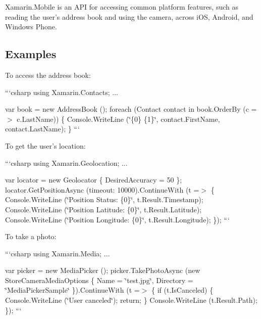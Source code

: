 Xamarin.\+Mobile is an A\+P\+I for accessing common platform features, such as reading the user's address book and using the camera, across i\+O\+S, Android, and Windows Phone.

\subsection*{Examples}

To access the address book\+:

```csharp using Xamarin.\+Contacts; ...

var book = new Address\+Book (); foreach (Contact contact in book.\+Order\+By (c =$>$ c.\+Last\+Name)) \{ Console.\+Write\+Line (\char`\"{}\{0\} \{1\}\char`\"{}, contact.\+First\+Name, contact.\+Last\+Name); \} ```

To get the user's location\+:

```csharp using Xamarin.\+Geolocation; ...

var locator = new Geolocator \{ Desired\+Accuracy = 50 \}; locator.\+Get\+Position\+Async (timeout\+: 10000).Continue\+With (t =$>$ \{ Console.\+Write\+Line (\char`\"{}\+Position Status\+: \{0\}\char`\"{}, t.\+Result.\+Timestamp); Console.\+Write\+Line (\char`\"{}\+Position Latitude\+: \{0\}\char`\"{}, t.\+Result.\+Latitude); Console.\+Write\+Line (\char`\"{}\+Position Longitude\+: \{0\}\char`\"{}, t.\+Result.\+Longitude); \}); ```

To take a photo\+:

```csharp using Xamarin.\+Media; ...

var picker = new Media\+Picker (); picker.\+Take\+Photo\+Async (new Store\+Camera\+Media\+Options \{ Name = \char`\"{}test.\+jpg\char`\"{}, Directory = \char`\"{}\+Media\+Picker\+Sample\char`\"{} \}).Continue\+With (t =$>$ \{ if (t.\+Is\+Canceled) \{ Console.\+Write\+Line (\char`\"{}\+User canceled\char`\"{}); return; \} Console.\+Write\+Line (t.\+Result.\+Path); \}); ``` 